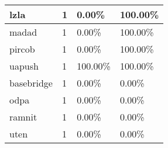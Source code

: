 \begin{table}[]
\begin{tabular}{|l|l|l|l|}
lzla                                     & 1                                 & 0.00\%                                      & 100.00\%                               \\ \hline
madad                                    & 1                                 & 0.00\%                                      & 100.00\%                               \\ \hline
pircob                                   & 1                                 & 0.00\%                                      & 100.00\%                               \\ \hline
uapush                                   & 1                                 & 100.00\%                                    & 100.00\%                               \\ \hline
basebridge                               & 1                                 & 0.00\%                                      & 0.00\%                                 \\ \hline
odpa                                     & 1                                 & 0.00\%                                      & 0.00\%                                 \\ \hline
ramnit                                   & 1                                 & 0.00\%                                      & 0.00\%                                 \\ \hline
uten                                     & 1                                 & 0.00\%                                      & 0.00\%                                 \\ \hline
\end{tabular}
\end{table}